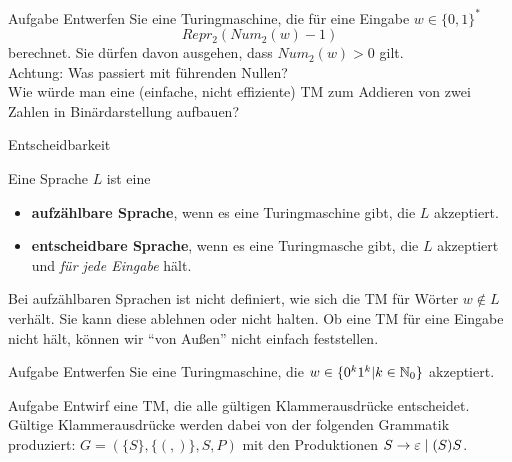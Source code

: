 \begin{frame}{Aufgabe}
	Entwerfen Sie eine Turingmaschine, die für eine Eingabe $w \in \{0, 1\}^*$ $$Repr_2(Num_2(w) - 1)$$ berechnet. Sie dürfen davon ausgehen, dass $Num_2(w) > 0$ gilt.\\
	\pause
	Achtung: Was passiert mit führenden Nullen?\\
	
	\bigskip
	Wie würde man eine (einfache, nicht effiziente) TM zum Addieren von zwei Zahlen in Binärdarstellung aufbauen?
\end{frame}


\begin{frame}{Entscheidbarkeit}
	\begin{Definition}
		Eine Sprache $L$ ist eine   
		\begin{itemize}[<+->]
			\item \textbf{aufzählbare Sprache}, wenn es eine Turingmaschine gibt, die $L$ akzeptiert.
			\item \textbf{entscheidbare Sprache}, wenn es eine Turingmasche gibt, die $L$ akzeptiert und \emph{für jede Eingabe} hält.
		\end{itemize}
	\end{Definition} \pause
	
	Bei aufzählbaren Sprachen ist nicht definiert, wie sich die TM für Wörter $ w \notin L$ verhält. Sie kann diese ablehnen oder nicht halten. Ob eine TM für eine Eingabe nicht hält, können wir \enquote{von Außen} nicht einfach feststellen.
\end{frame}


\begin{frame}{Aufgabe}
	Entwerfen Sie eine Turingmaschine, die $w\in \{0^k1^k | k\in \mathbb{N}_0 \} $ akzeptiert.
\end{frame}

\begin{frame}{Aufgabe}
	Entwirf eine TM, die alle gültigen Klammerausdrücke entscheidet.\\
	Gültige Klammerausdrücke werden dabei von der folgenden Grammatik produziert: $ G = (\{S\},\{(, )\}, S, P )$ mit den Produktionen $ S \to \varepsilon \mid (S)S$.
\end{frame}
